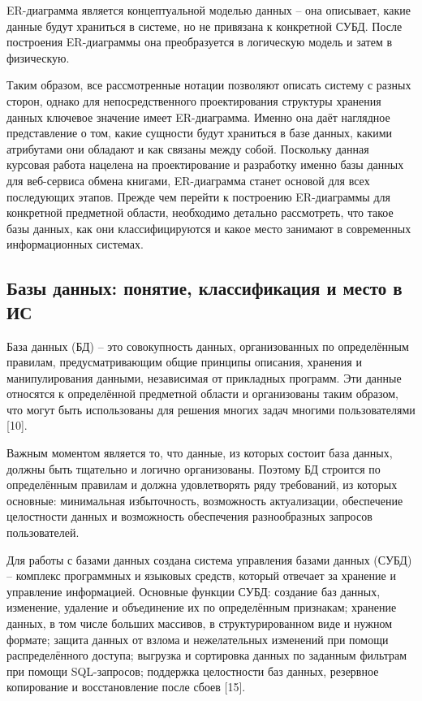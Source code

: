 \documentclass[14pt,a4paper]{extarticle}
\begin{document}
ER-диаграмма является концептуальной моделью данных -- она описывает,
какие данные будут храниться в системе, но не привязана к конкретной
СУБД. После построения ER-диаграммы она преобразуется в логическую
модель и затем в физическую.

Таким образом, все рассмотренные нотации позволяют описать систему с
разных сторон, однако для непосредственного проектирования структуры
хранения данных ключевое значение имеет ER-диаграмма. Именно она даёт
наглядное представление о том, какие сущности будут храниться в базе
данных, какими атрибутами они обладают и как связаны между собой.
Поскольку данная курсовая работа нацелена на проектирование и разработку
именно базы данных для веб-сервиса обмена книгами, ER-диаграмма станет
основой для всех последующих этапов. Прежде чем перейти к построению
ER-диаграммы для конкретной предметной области, необходимо детально
рассмотреть, что такое базы данных, как они классифицируются и какое
место занимают в современных информационных системах.

\subsection{Базы данных: понятие, классификация и место в ИС}

База данных (БД) -- это совокупность данных, организованных по
определённым правилам, предусматривающим общие принципы описания,
хранения и манипулирования данными, независимая от прикладных программ.
Эти данные относятся к определённой предметной области и организованы
таким образом, что могут быть использованы для решения многих задач
многими пользователями [10].

Важным моментом является то, что данные, из которых состоит база данных,
должны быть тщательно и логично организованы. Поэтому БД строится по
определённым правилам и должна удовлетворять ряду требований, из которых
основные: минимальная избыточность, возможность актуализации,
обеспечение целостности данных и возможность обеспечения разнообразных
запросов пользователей.

Для работы с базами данных создана система управления базами данных
(СУБД) -- комплекс программных и языковых средств, который отвечает за
хранение и управление информацией. Основные функции СУБД: создание баз
данных, изменение, удаление и объединение их по определённым признакам;
хранение данных, в том числе больших массивов, в структурированном виде
и нужном формате; защита данных от взлома и нежелательных изменений при
помощи распределённого доступа; выгрузка и сортировка данных по заданным
фильтрам при помощи SQL-запросов; поддержка целостности баз данных,
резервное копирование и восстановление после сбоев [15].
\end{document}
